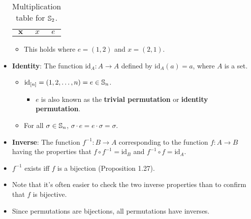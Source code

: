 \documentclass[../apprentice.tex]{subfiles}
\begin{document}
\begin{itemize}
\begin{table}[h!]
\begin{tabular}{c|cc}
            $\bm{x}$ & $x$      & $e$\\
        \end{tabular}
        \caption{Multiplication table for $\mathbb{S}_2$.}
        \label{tab:S2MultiplicationTable}
    \end{table}
    \begin{itemize}
        \item This holds where $e=(1,2)$ and $x=(2,1)$.
    \end{itemize}
    \item \textbf{Identity}: The function $\text{id}_A:A\to A$ defined by $\text{id}_A(a)=a$, where $A$ is a set.
    \begin{itemize}
        \item $\text{id}_{[n]}=(1,2,\dots,n)=e\in\mathbb{S}_n$.
        \begin{itemize}
            \item $e$ is also known as the \textbf{trivial permutation} or \textbf{identity permutation}.
        \end{itemize}
        \item For all $\sigma\in\mathbb{S}_n$, $\sigma\cdot e=e\cdot\sigma=\sigma$.
    \end{itemize}
    \item \textbf{Inverse}: The function $f^{-1}:B\to A$ corresponding to the function $f:A\to B$ having the properties that $f\circ f^{-1}=\text{id}_B$ and $f^{-1}\circ f=\text{id}_A$.
    \item $f^{-1}$ exists iff $f$ is a bijection (Proposition 1.27).
    \item Note that it's often easier to check the two inverse properties than to confirm that $f$ is bijective.
    \item Since permutations are bijections, all permutations have inverses.
\end{itemize}
\end{document}
